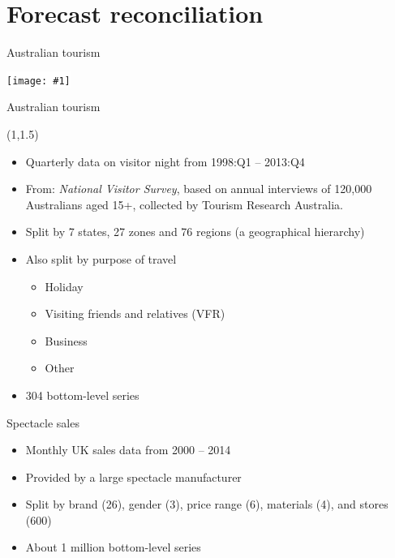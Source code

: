 \documentclass[14pt,ignorenonframetext,]{beamer}
\providecommand{\tightlist}{%
  \setlength{\itemsep}{0pt}\setlength{\parskip}{0pt}}
\def\full#1{\vspace*{0.2cm}\par\centerline{\colorbox{white}{\texttt{[image: \#1]}}}}
\begin{document}
\hypertarget{forecast-reconciliation}{%
\section{Forecast reconciliation}\label{forecast-reconciliation}}

\begin{frame}{Australian tourism}
\protect\hypertarget{australian-tourism}{}

\full{regions1_with_labels}

\end{frame}

\begin{frame}{Australian tourism}
\protect\hypertarget{australian-tourism-1}{}

\begin{textblock}{10}(1,1.5)\small
\begin{block}{}
  \begin{itemize}\itemsep=0cm\parskip=0cm
    \item Quarterly data on visitor night from 1998:Q1 -- 2013:Q4
    \item From: \textit{National Visitor Survey}, based on annual interviews of 120,000 Australians aged 15+, collected by Tourism Research Australia.
    \item Split by 7 states, 27 zones and 76 regions (a geographical hierarchy)
    \item Also split by purpose of travel
      \begin{itemize}
        \item Holiday
        \item Visiting friends and relatives (VFR)
        \item Business
        \item Other
      \end{itemize}
    \item 304 bottom-level series
  \end{itemize}
\end{block}
\end{textblock}

\end{frame}

\begin{frame}{Spectacle sales}
\protect\hypertarget{spectacle-sales}{}

\vspace*{4.8cm}

\begin{itemize}
\tightlist
\item
  Monthly UK sales data from 2000 -- 2014
\item
  Provided by a large spectacle manufacturer
\item
  Split by brand (26), gender (3), price range (6), materials (4), and
  stores (600)
\item
  About 1 million bottom-level series
\end{itemize}

\end{frame}
\end{document}
